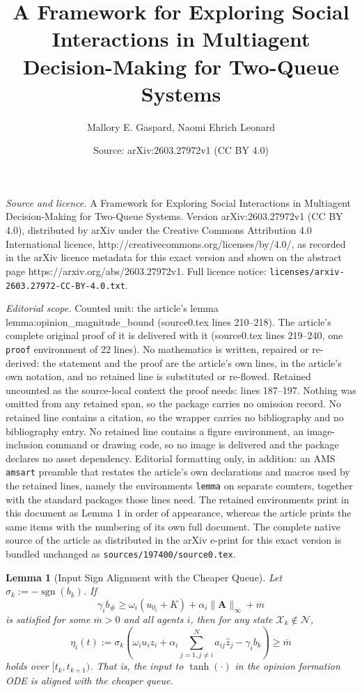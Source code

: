 \documentclass[10pt,a4paper]{amsart}
\title{\LARGE A Framework for Exploring Social Interactions in Multiagent Decision-Making for Two-Queue Systems}
\author{Mallory E. Gaspard, Naomi Ehrich Leonard}
\date{Source: arXiv:2603.27972v1 (CC BY 4.0)}
\newtheorem{lemma}{Lemma}
\DeclareMathOperator{\sgn}{sgn}
\begin{document}
\maketitle

\noindent\emph{Source and licence.} \LARGE A Framework for Exploring Social Interactions in Multiagent Decision-Making for Two-Queue Systems. Version arXiv:2603.27972v1 (CC BY 4.0), distributed by arXiv under the Creative Commons Attribution 4.0 International licence, http://creativecommons.org/licenses/by/4.0/, as recorded in the arXiv licence metadata for this exact version and shown on the abstract page https://arxiv.org/abs/2603.27972v1. Full licence notice: \texttt{licenses/arxiv-2603.27972-CC-BY-4.0.txt}.\par\smallskip

\noindent\textit{Editorial scope.} Counted unit: the article's lemma lemma:opinion\_magnitude\_bound (source0.tex lines 210--218). The article's complete original proof of it is delivered with it (source0.tex lines 219--240, one \texttt{proof} environment of 22 lines). No mathematics is written, repaired or re-derived: the statement and the proof are the article's own lines, in the article's own notation, and no retained line is substituted or re-flowed.  Retained uncounted as the source-local context the proof needs: lines 187--197.  Nothing was omitted from any retained span, so the package carries no omission record.  No retained line contains a citation, so the wrapper carries no bibliography and no bibliography entry.  No retained line contains a figure environment, an image-inclusion command or drawing code, so no image is delivered and the package declares no asset dependency.  Editorial formatting only, in addition: an AMS \texttt{amsart} preamble that restates the article's own declarations and macros used by the retained lines, namely the environments \texttt{lemma} on separate counters, together with the standard packages those lines need.  The retained environments print in this document as Lemma 1 in order of appearance, whereas the article prints the same items with the numbering of its own full document.  The complete native source of the article as distributed in the arXiv e-print for this exact version is bundled unchanged as \texttt{sources/197400/source0.tex}.
\begin{lemma}[Input Sign Alignment with the Cheaper Queue]\label{lemma:cheaper_queue_input_alignment}
    Let $\sigma_k := -\sgn(b_k)$. If 
    \begin{equation}
        \gamma_i b_{\#} \ge \omega_i(u_{0_i} + K) + \alpha_i\|\boldsymbol{A}\|_{\infty} + \overline{m}
    \end{equation}
    is satisfied for some $\overline{m} > 0$ and all agents $i$, then for any state $\mathcal{X}_k \notin \mathcal{N}$,
    \begin{equation*}
        \eta_i(t) := \sigma_k\left(\omega_i u_i z_i + \alpha_i \sum^N_{j = 1, j\neq i}a_{ij}\hat{z}_j - \gamma_i b_k \right) \ge \overline{m}
    \end{equation*}
    holds over $[t_k, t_{k+1})$. That is, the input to $\tanh(\cdot)$ in the opinion formation ODE is aligned with the cheaper queue.
\end{lemma}
\end{document}

